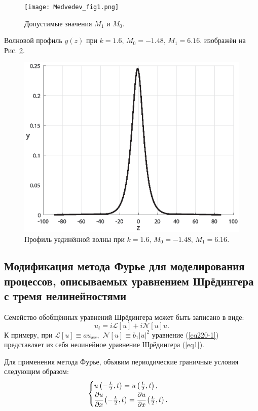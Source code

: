 \documentclass[12pt,a4paper]{article}
\begin{document}
	\begin{figure}[H]  %
		\center
		\texttt{[image: Medvedev\_fig1.png]} 
		\caption{Допустимые значения \(M_{1}\) и \(M_{0}.\)}
		\label{fig1}
	\end{figure}

	Волновой профиль \(y(z)\) при \(k=1.6,\, M_{0}=-1.48,\, M_{1}=6.16.\) изображён на Рис. \ref{fig8}.
	\begin{figure}[H]
		\center
		\includegraphics[width=0.5\linewidth]{Medvedev_fig4.eps}
		\caption{Профиль уединённой волны при \(k=1.6,\, M_{0}=-1.48,\, M_{1}=6.16.\)}
		\label{fig8}
	\end{figure}
\subsection[Модификация метода Фурье для моделирования процессов, описываемых уравнением Шрёдингера с тремя нелинейностями]{Модификация метода Фурье для моделирования процессов, описываемых уравнением Шрёдингера с тремя нелинейностями}\label{ch220}
	Семейство обобщённых уравнений Шрёдингера может быть записано в виде:
	\begin{equation} \label{eq220-1}
		u_{t}=i\mathscr{L} [u]+i\mathscr{N}[u]u.
	\end{equation}
	К примеру, при \(\mathscr{L} [u] \equiv a u_{xx},  \,\,  \mathscr{N} [u] \equiv b_{1} |u|^2\) уравнение (\ref{eq220-1}) представляет из себя нелинейное уравнение Шрёдингера (\ref{eq1}).

	Для применения метода Фурье, объявим периодические граничные условия следующим образом:
	\begin{equation} \label{eq30}
		\begin{aligned}
			\begin{cases}
				u\left(-\frac{L}{2},t\right)=u\left(\frac{L}{2},t\right),\\
				\cfrac{\partial u}{\partial x}\left(-\frac{L}{2},t\right)=\cfrac{\partial u}{\partial x}\left(\frac{L}{2},t\right).
			\end{cases}
		\end{aligned}
	\end{equation}
\end{document}

